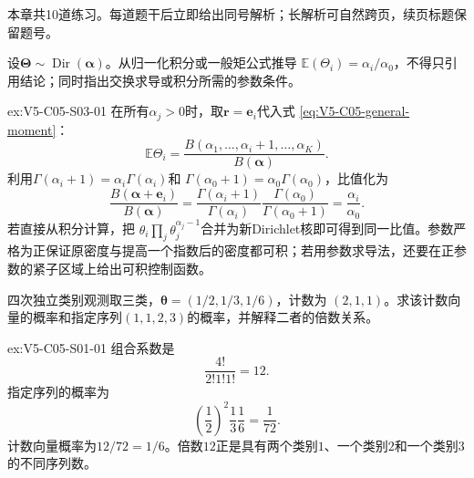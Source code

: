 \label{struct:V5-C05-CH33}
\label{struct:V5-C05-CH34}
\begin{chapterexercisebox}
\label{struct:V5-C05-CH35}
本章共10道练习。每道题干后立即给出同号解析；长解析可自然跨页，续页标题保留题号。
\end{chapterexercisebox}

\begin{SLChapterExercisePairSection}

\SLSourceBookExercises

\begin{exercise}\label{ex:V5-C05-S03-01}
设$\boldsymbol\Theta\sim\operatorname{Dir}(\boldsymbol\alpha)$。从归一化积分或一般矩公式推导
$\mathbb E(\Theta_i)=\alpha_i/\alpha_0$，不得只引用结论；同时指出交换求导或积分所需的参数条件。
\end{exercise}
\ifSLFullEdition
{}\label{sol:V5-C05-S03-01}
\begin{chapterexercisesolution}{ex:V5-C05-S03-01}
\nopagebreak[4]
在所有$\alpha_j>0$时，取$\boldsymbol r=\boldsymbol e_i$代入式
\eqref{eq:V5-C05-general-moment}：
\[
\mathbb E\Theta_i
=\frac{B(\alpha_1,\ldots,\alpha_i+1,\ldots,\alpha_K)}
{B(\boldsymbol\alpha)}.
\]
利用$\Gamma(\alpha_i+1)=\alpha_i\Gamma(\alpha_i)$和
$\Gamma(\alpha_0+1)=\alpha_0\Gamma(\alpha_0)$，比值化为
\[
\frac{B(\boldsymbol\alpha+\boldsymbol e_i)}
{B(\boldsymbol\alpha)}
=\frac{\Gamma(\alpha_i+1)}{\Gamma(\alpha_i)}
\frac{\Gamma(\alpha_0)}{\Gamma(\alpha_0+1)}
=\frac{\alpha_i}{\alpha_0}.
\]
若直接从积分计算，把
$\theta_i\prod_j\theta_j^{\alpha_j-1}$合并为新Dirichlet核即可得到同一比值。参数严格为正保证原密度与提高一个指数后的密度都可积；若用参数求导法，还要在正参数的紧子区域上给出可积控制函数。
\end{chapterexercisesolution}
\fi

\SLLectureSupplementExercises

\begin{exercise}\label{ex:V5-C05-S01-01}
四次独立类别观测取三类，$\boldsymbol\theta=(1/2,1/3,1/6)$，计数为
$(2,1,1)$。求该计数向量的概率和指定序列$(1,1,2,3)$的概率，并解释二者的倍数关系。
\end{exercise}
\ifSLFullEdition
{}\label{sol:V5-C05-S01-01}
\begin{chapterexercisesolution}{ex:V5-C05-S01-01}
\nopagebreak[4]
组合系数是
\[
\frac{4!}{2!1!1!}=12.
\]
指定序列的概率为
\[
\left(\frac12\right)^2\frac13\frac16=\frac1{72}.
\]
计数向量概率为$12/72=1/6$。倍数$12$正是具有两个类别$1$、一个类别$2$和一个类别$3$的不同序列数。
\end{chapterexercisesolution}
\fi


\end{SLChapterExercisePairSection}
